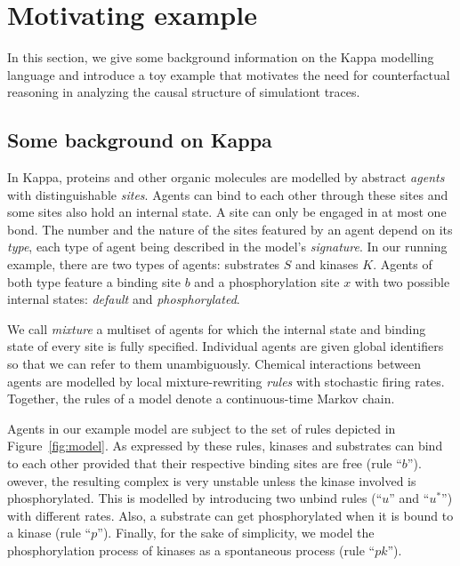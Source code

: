 \pagebreak

\section{Motivating example}\label{sec:example}


In this section, we give some background information on the Kappa
modelling language and introduce a toy example that motivates the need
for counterfactual reasoning in analyzing the causal structure of
simulationt traces.


\subsection{Some background on Kappa}

In Kappa, proteins and other organic molecules are modelled by
abstract \emph{agents} with distinguishable \emph{sites}. Agents can
bind to each other through these sites and some sites also hold an
internal state. A site can only be engaged in at most one bond. The
number and the nature of the sites featured by an agent depend on its
\emph{type}, each type of agent being described in the model's
\emph{signature}. In our running example, there are two types of
agents: substrates $S$ and kinases $K$. Agents of both type feature a
binding site $b$ and a phosphorylation site $x$ with two possible
internal states: \emph{default} and \emph{phosphorylated}.

We call \emph{mixture} a multiset of agents for which the internal
state and binding state of every site is fully specified.  Individual
agents are given global identifiers so that we can refer to them
unambiguously. 
\noindent
Chemical interactions between agents are modelled by local
mixture-rewriting \emph{rules} with stochastic firing rates.
Together, the rules of a model denote a continuous-time Markov chain.

Agents in our example model are subject to the set of rules depicted
in Figure~\ref{fig:model}. As expressed by these rules, kinases and
substrates can bind to each other provided that their respective
binding sites are free (rule ``$b$''). owever, the resulting complex is very
unstable unless the kinase involved is phosphorylated. This is
modelled by introducing two unbind rules (``$u$'' and ``$u^{*}$'') with
different rates. Also, a substrate can get phosphorylated when it is
bound to a kinase (rule ``$p$''). Finally, for the sake of simplicity, we
model the phosphorylation process of kinases as a spontaneous process
(rule ``$pk$'').

